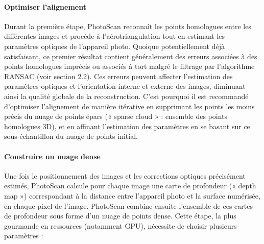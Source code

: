\paragraph{Optimiser l’alignement}

Durant la première étape, PhotoScan reconnaît les points homologues entre les différentes images et procède à l’aérotriangulation tout en estimant les paramètres optiques de l’appareil photo. Quoique potentiellement déjà satisfaisant, ce premier résultat contient généralement des erreurs associées à des points homologues imprécis ou associés à tort malgré le filtrage par l’algorithme RANSAC (voir section 2.2). Ces erreurs peuvent affecter l’estimation des paramètres optiques et l’orientation interne et externe des images, diminuant ainsi la qualité globale de la reconstruction. C’est pourquoi il est recommandé d’optimiser l’alignement de manière itérative en supprimant les points les moins précis du nuage de points épars (« sparse cloud » : ensemble des points homologues 3D), et en affinant l’estimation des paramètres en se basant sur ce sous-échantillon du nuage de points initial.


\paragraph{Construire un nuage dense}

Une fois le positionnement des images et les corrections optiques précisément estimés, PhotoScan calcule pour chaque image une carte de profondeur (« depth map ») correspondant à la distance entre l’appareil photo et la surface numérisée, en chaque pixel de l’image. PhotoScan combine ensuite l’ensemble de ces cartes de profondeur sous forme d’un nuage de points dense. Cette étape, la plus gourmande en ressources (notamment GPU), nécessite de choisir plusieurs paramètres :

